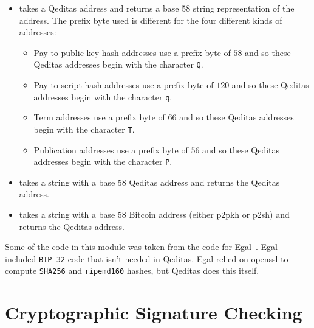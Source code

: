 \begin{itemize}
\item {} takes a Qeditas address and returns a base 58 string representation of the address.
The prefix byte used is different for the four different kinds of addresses:
\begin{itemize}
\item Pay to public key hash addresses use a prefix byte of $58$
and so these Qeditas addresses begin with the character {\tt{Q}}.
\item Pay to script hash addresses use a prefix byte of $120$
and so these Qeditas addresses begin with the character {\tt{q}}.
\item Term addresses use a prefix byte of $66$
and so these Qeditas addresses begin with the character {\tt{T}}.
\item Publication addresses use a prefix byte of $56$
and so these Qeditas addresses begin with the character {\tt{P}}.
\end{itemize}
\item {} takes a string with a base 58 Qeditas address and returns the Qeditas address.
\item {} takes a string with a base 58 Bitcoin address (either p2pkh or p2sh) and returns the Qeditas address.
\end{itemize}
Some of the code in this module was taken from the code for Egal~\cite{Brown2014}.
Egal included {\tt{BIP 32}} code that isn't needed in Qeditas.
Egal relied on openssl to compute {\tt{SHA256}} and {\tt{ripemd160}} hashes, but Qeditas does this itself.

\section{Cryptographic Signature Checking}

